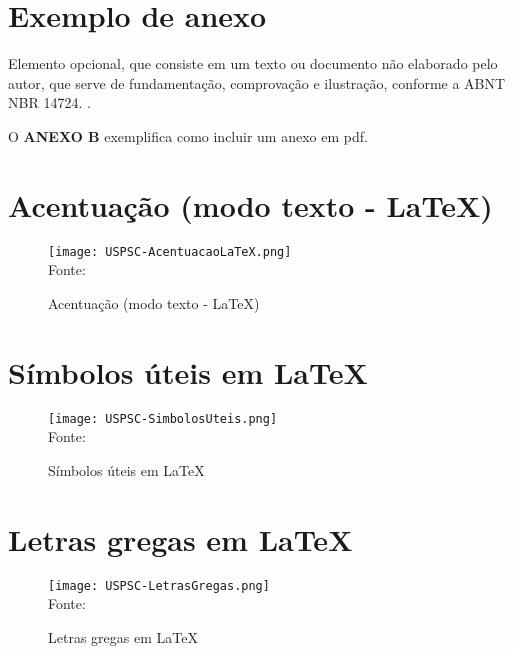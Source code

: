 \begin{anexosenv}

\partanexos

\chapter{Exemplo de anexo}
Elemento opcional, que consiste em um texto ou documento não elaborado pelo autor, que serve de fundamentação, comprovação e ilustração, conforme a ABNT NBR 14724. \cite{nbr14724}.

O \textbf{ANEXO B} exemplifica como incluir um anexo em pdf.

\chapter{Acentuação (modo texto - \LaTeX)}
\begin{figure}[H]
	\begin{center}
	\caption{\label{fig_anexob}Acentuação (modo texto - \LaTeX)}
	\texttt{[image: USPSC-AcentuacaoLaTeX.png]} \\
	Fonte: 
	\end{center}	
\end{figure}

\chapter{Símbolos úteis em \LaTeX}
\begin{figure}[H]
	\begin{center}
		\caption{\label{fig_anexoc}Símbolos úteis em \LaTeX}
		\texttt{[image: USPSC-SimbolosUteis.png]} \\
		Fonte: 
	\end{center}	
\end{figure}


\chapter{Letras gregas em \LaTeX}
\begin{figure}[H]
	\begin{center}
		\caption{\label{fig_anexod}Letras gregas em \LaTeX}
		\texttt{[image: USPSC-LetrasGregas.png]} \\
		Fonte: 
	\end{center}	
\end{figure}

\end{anexosenv}
